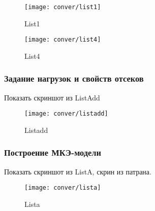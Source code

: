 \begin{figure}[H]
\centering
\texttt{[image: conver/list1]}
\caption{List1}
\label{fig:conver_list1}
\end{figure}

\begin{figure}[H]
\centering
\texttt{[image: conver/list4]}
\caption{List4}
\label{fig:conver_list4}
\end{figure}

\subsubsection{Задание нагрузок и свойств отсеков}
Показать скриншот из ListAdd

\begin{figure}[H]
\centering
\texttt{[image: conver/listadd]}
\caption{Listadd}
\label{fig:conver_listadd}
\end{figure}

\subsubsection{Построение МКЭ-модели}
Показать скриншот из ListA, скрин из патрана. 

\begin{figure}[H]
\centering
\texttt{[image: conver/lista]}
\caption{Lista}
\label{fig:conver_lista}
\end{figure}
